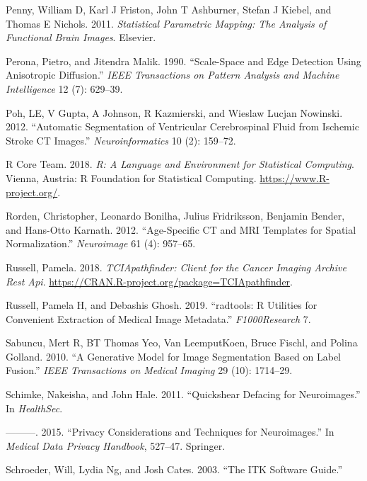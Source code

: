 \documentclass[]{elsarticle} %
\begin{document}
\leavevmode\hypertarget{ref-spm}{}%
Penny, William D, Karl J Friston, John T Ashburner, Stefan J Kiebel, and Thomas E Nichols. 2011. \emph{Statistical Parametric Mapping: The Analysis of Functional Brain Images}. Elsevier.

\leavevmode\hypertarget{ref-peronamalik}{}%
Perona, Pietro, and Jitendra Malik. 1990. ``Scale-Space and Edge Detection Using Anisotropic Diffusion.'' \emph{IEEE Transactions on Pattern Analysis and Machine Intelligence} 12 (7): 629--39.

\leavevmode\hypertarget{ref-poh2012automatic}{}%
Poh, LE, V Gupta, A Johnson, R Kazmierski, and Wieslaw Lucjan Nowinski. 2012. ``Automatic Segmentation of Ventricular Cerebrospinal Fluid from Ischemic Stroke CT Images.'' \emph{Neuroinformatics} 10 (2): 159--72.

\leavevmode\hypertarget{ref-R}{}%
R Core Team. 2018. \emph{R: A Language and Environment for Statistical Computing}. Vienna, Austria: R Foundation for Statistical Computing. \url{https://www.R-project.org/}.

\leavevmode\hypertarget{ref-rorden2012age}{}%
Rorden, Christopher, Leonardo Bonilha, Julius Fridriksson, Benjamin Bender, and Hans-Otto Karnath. 2012. ``Age-Specific CT and MRI Templates for Spatial Normalization.'' \emph{Neuroimage} 61 (4): 957--65.

\leavevmode\hypertarget{ref-TCIApathfinder}{}%
Russell, Pamela. 2018. \emph{TCIApathfinder: Client for the Cancer Imaging Archive Rest Api}. \url{https://CRAN.R-project.org/package=TCIApathfinder}.

\leavevmode\hypertarget{ref-radtools}{}%
Russell, Pamela H, and Debashis Ghosh. 2019. ``radtools: R Utilities for Convenient Extraction of Medical Image Metadata.'' \emph{F1000Research} 7.

\leavevmode\hypertarget{ref-sabuncu2010generative}{}%
Sabuncu, Mert R, BT Thomas Yeo, Van LeemputKoen, Bruce Fischl, and Polina Golland. 2010. ``A Generative Model for Image Segmentation Based on Label Fusion.'' \emph{IEEE Transactions on Medical Imaging} 29 (10): 1714--29.

\leavevmode\hypertarget{ref-quickshear}{}%
Schimke, Nakeisha, and John Hale. 2011. ``Quickshear Defacing for Neuroimages.'' In \emph{HealthSec}.

\leavevmode\hypertarget{ref-schimke2015privacy}{}%
---------. 2015. ``Privacy Considerations and Techniques for Neuroimages.'' In \emph{Medical Data Privacy Handbook}, 527--47. Springer.

\leavevmode\hypertarget{ref-itk}{}%
Schroeder, Will, Lydia Ng, and Josh Cates. 2003. ``The ITK Software Guide.''
\end{document}
